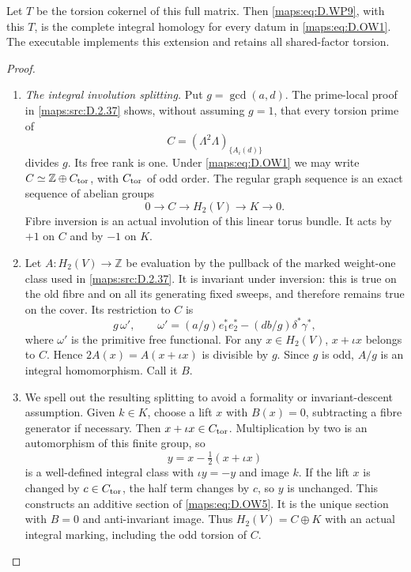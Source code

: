 \begin{theorem}
Let $T$ be the torsion cokernel of this full matrix.
Then \eqref{maps:eq:D.WP9}, with this $T$, is the complete integral
homology for every datum in \eqref{maps:eq:D.OW1}.
The executable 
implements this extension and retains all shared-factor
torsion.

\end{theorem}


\begin{proof}
\begin{enumerate}[label=\arabic*.,leftmargin=*]
\item \emph{The integral involution splitting.}
Put $g=\gcd(a,d)$. The prime-local proof in \ref{maps:src:D.2.37}
shows, without assuming $g=1$, that every torsion
prime of
\[
 C=(\Lambda^2\Lambda)_{\{A_i(d)\}}
\]
divides $g$. Its free rank is one. Under \eqref{maps:eq:D.OW1}
we may write $C\simeq\mathbb Z\oplus C_{\rm tor}$,
with $C_{\rm tor}$ of odd order. The regular graph
sequence is an exact sequence of abelian groups
\[
                 0\longrightarrow C\longrightarrow
           H_2(V)\longrightarrow K\longrightarrow0.      \tag{D.OW5}\label{maps:eq:D.OW5}
\]
Fibre inversion is an actual involution of this
linear torus bundle. It acts by $+1$ on $C$ and
by $-1$ on $K$.

\item Let $A:H_2(V)\to\mathbb Z$ be evaluation by the
pullback of the marked weight-one class used in
\ref{maps:src:D.2.37}. It is invariant under inversion: this is
true on the old fibre and on all its generating
fixed sweeps, and therefore remains true on the
cover. Its restriction to $C$ is
\[
 g\,\omega',\qquad
 \omega'=(a/g)e_1^*e_2^*-(db/g)\delta^*\gamma^*,
\]
where $\omega'$ is the primitive free functional.
For any $x\in H_2(V)$, $x+\iota x$ belongs to $C$.
Hence
$2A(x)=A(x+\iota x)$ is divisible by $g$.
Since $g$ is odd, $A/g$ is an integral homomorphism.
Call it $B$.

\item We spell out the resulting splitting to avoid a
formality or invariant-descent assumption. Given
$k\in K$, choose a lift $x$ with $B(x)=0$, subtracting
a fibre generator if necessary. Then
$x+\iota x\in C_{\rm tor}$. Multiplication by two
is an automorphism of this finite group, so
\[
                  y=x-\tfrac12(x+\iota x)                 \tag{D.OW6}\label{maps:eq:D.OW6}
\]
is a well-defined integral class with
$\iota y=-y$ and image $k$. If the lift $x$ is
changed by $c\in C_{\rm tor}$, the half term
changes by $c$, so $y$ is unchanged.
This constructs an additive section of \eqref{maps:eq:D.OW5}.
It is the unique section with $B=0$ and
anti-invariant image. Thus
$H_2(V)=C\oplus K$ with an actual integral marking,
including the odd torsion of $C$.


\end{enumerate}
\end{proof}

